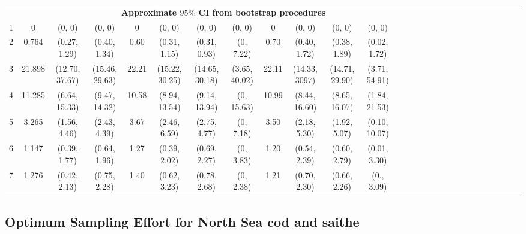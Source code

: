 \documentclass[a4paper 12pt]{article}
\numberwithin{equation}{section}
\begin{document}
\begin{small}
\begin{table}[h!]
\begin{tabular}{ccccccccccccccccccccccccccc}
 &&& \multicolumn{8}{c}{\bf Approximate $95 \%$ CI from bootstrap procedures} \\[1.5ex]
1  & 0      &(0, 0)          & (0, 0)        & 0     &(0, 0)          &  (0, 0)          & (0, 0)       & 0     &(0, 0) & (0, 0)         & (0, 0)          & \\[1ex]
2  & 0.764  & (0.27, 1.29)   & (0.40, 1.34)  & 0.60  &(0.31, 1.15)    &  (0.31, 0.93)    & (0, 7.22)    & 0.70  &(0.40, 1.72)  & (0.38, 1.89)   & (0.02, 1.72) \\[1ex]
3  & 21.898 & (12.70, 37.67) & (15.46, 29.63)& 22.21 & (15.22, 30.25) &  (14.65, 30.18)  & (3.65, 40.02)& 22.11 &(14.33, 3097) & (14.71, 29.90) & (3.71, 54.91)\\[1ex]
4  & 11.285 &(6.64, 15.33)   & (9.47, 14.32) & 10.58 &(8.94, 13.54)   &  (9.14, 13.94)   & (0, 15.63)   & 10.99 &(8.44, 16.60) & (8.65, 16.07)  & (1.84, 21.53)\\[1ex]
5  & 3.265  &(1.56, 4.46)    & (2.43, 4.39)  & 3.67  &(2.46, 6.59)    &  (2.75, 4.77)    & (0, 7.18)    & 3.50  &(2.18, 5.30)  & (1.92, 5.07)   & (0.10, 10.07)\\[1ex]
6  & 1.147  &(0.39, 1.77)    & (0.64, 1.96)  & 1.27  & (0.39, 2.02)   &  (0.69, 2.27)    & (0, 3.83)    & 1.20  & (0.54, 2.39)  & (0.60, 2.79)   & (0.01, 3.30)\\[1ex]
7  & 1.276  &(0.42, 2.13)    & (0.75, 2.28)  & 1.40  &(0.62, 3.23)    &  (0.78, 2.68)    & (0, 2.38)    & 1.21  &(0.70, 2.30)  & (0.66, 2.26)   & (0., 3.09) \\[1ex]
\hline
\end{tabular}
\end{table}
\end{small}


\subsection{Optimum Sampling Effort for North Sea cod and saithe}
\label{sec:resultsoptim}
\end{document}
